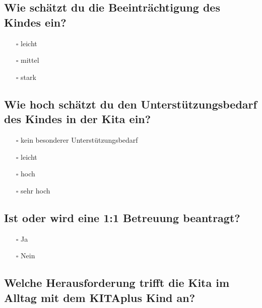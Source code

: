 \documentclass[
  ngerman,
  11pt,
  paper=a4,
  twoside,
  titlepage=true,
  openright,
  abstract=on,
  toc=listofnumbered,
  numbers=noenddot,
  chapterprefix=true,
  headings=optiontohead,
  svgnames,
  dvipsnames]{scrreprt}
\providecommand{\tightlist}{%
  \setlength{\itemsep}{0pt}\setlength{\parskip}{0pt}}
\begin{document}
\hypertarget{wie-schuxe4tzt-du-die-beeintruxe4chtigung-des-kindes-ein}{%
\subsection*{Wie schätzt du die Beeinträchtigung des Kindes
ein?}\label{wie-schuxe4tzt-du-die-beeintruxe4chtigung-des-kindes-ein}}

\begin{itemize}
\tightlist
\item[$\square$]
  leicht
\item[$\square$]
  mittel
\item[$\square$]
  stark
\end{itemize}

\hypertarget{wie-hoch-schuxe4tzt-du-den-unterstuxfctzungsbedarf-des-kindes-in-der-kita-ein}{%
\subsection*{Wie hoch schätzt du den Unterstützungsbedarf des Kindes in
der Kita
ein?}\label{wie-hoch-schuxe4tzt-du-den-unterstuxfctzungsbedarf-des-kindes-in-der-kita-ein}}

\begin{itemize}
\tightlist
\item[$\square$]
  kein besonderer Unterstützungsbedarf
\item[$\square$]
  leicht
\item[$\square$]
  hoch
\item[$\square$]
  sehr hoch
\end{itemize}

\hypertarget{ist-oder-wird-eine-11-betreuung-beantragt}{%
\subsection*{Ist oder wird eine 1:1 Betreuung
beantragt?}\label{ist-oder-wird-eine-11-betreuung-beantragt}}

\begin{itemize}
\tightlist
\item[$\square$]
  Ja
\item[$\square$]
  Nein
\end{itemize}

\hypertarget{welche-herausforderung-trifft-die-kita-im-alltag-mit-dem-kitaplus-kind-an}{%
\subsection*{Welche Herausforderung trifft die Kita im Alltag mit dem
KITAplus Kind
an?}\label{welche-herausforderung-trifft-die-kita-im-alltag-mit-dem-kitaplus-kind-an}}
\end{document}

